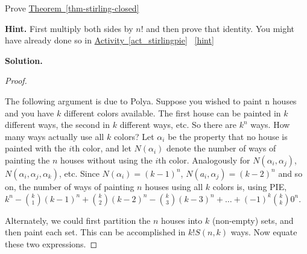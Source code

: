 \documentclass{book}
\begin{document}
\setcounter{project}{285}
\addtocounter{project}{-1}
\begin{activity}[]\label{activity-278}
\hypertarget{p-1470}{}%
Prove \hyperref[thm-stirling-closed]{Theorem~\ref{thm-stirling-closed}}%
\par\smallskip%
\noindent\textbf{Hint.}\hypertarget{hint-187}{}\quad%
\hypertarget{p-1471}{}%
First multiply both sides by \(n!\) and then prove that identity.  You might have already done so in \hyperref[act_stirlingpie]{Activity~\ref{act_stirlingpie}}%
~\hfill{\tiny\hyperlink{a-285}{[hint]}\hypertarget{q-285}{}}\par\smallskip%
\noindent\textbf{Solution.}\hypertarget{solution-198}{}\quad%
\begin{proof}\hypertarget{proof-7}{}
\hypertarget{p-1472}{}%
The following argument is due to Polya. Suppose you wished to paint n houses and you have \(k\) different colors available. The first house can be painted in \(k\) different ways, the second in \(k\) different ways, etc. So there are \(k^{n}\) ways. How many ways actually use all \(k\) colors? Let \(\alpha_{i}\) be the property that no house is painted with the \(i\)th color, and let \(N(\alpha_{i})\) denote the number of ways of painting the \(n\) houses without using the \(i\)th color. Analogously for \(N(\alpha_{i},\alpha_{j})\), \(N(\alpha_{i},\alpha_{j},\alpha_{k})\), etc. Since \(N(\alpha_{i}) = (k - 1)^{n}\), \(N(a_{i},\alpha_{j}) = ( k - 2)^{n}\) and so on, the number of ways of painting \(n\) houses using all \(k\) colors is, using PIE, \(k^{n} -\binom{k}{1} \left(k - 1 \right)^{n} + \binom{k}{2} \left( k - 2 \right)^{n} - \binom{k}{3}      \left( k - 3 \right)^{n} + \ldots + \left( - 1 \right)^{k}\binom{k}{k} 0^{n}\).%
\par
\hypertarget{p-1473}{}%
Alternately, we could first partition the \(n\) houses into \(k\) (non-empty) sets, and then paint each set. This can be    accomplished in \(k!S(n,k)\) ways. Now equate these two expressions.%
\end{proof}
\end{activity}
\end{document}
